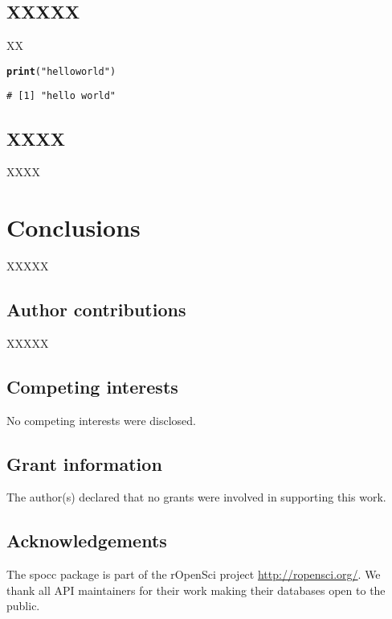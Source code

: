 \documentclass[10pt,a4paper,twocolumn]{article}\usepackage[]{graphicx}\usepackage[]{color}
\makeatletter
\newcommand{\hlstr}[1]{\textcolor[rgb]{0.192,0.494,0.8}{#1}}%
\newcommand{\hlstd}[1]{\textcolor[rgb]{0.345,0.345,0.345}{#1}}%
\newcommand{\hlkwd}[1]{\textcolor[rgb]{0.737,0.353,0.396}{\textbf{#1}}}%
\newenvironment{kframe}{%
 \def\at@end@of@kframe{}%
 \ifinner\ifhmode%
  \def\at@end@of@kframe{\end{minipage}}%
  \begin{minipage}{\columnwidth}%
 \fi\fi%
 \def\FrameCommand##1{\hskip\@totalleftmargin \hskip-\fboxsep
 \colorbox{shadecolor}{##1}\hskip-\fboxsep
     \hskip-\linewidth \hskip-\@totalleftmargin \hskip\columnwidth}%
 \MakeFramed {\advance\hsize-\width
   \@totalleftmargin\z@ \linewidth\hsize
   \@setminipage}}%
 {\par\unskip\endMakeFramed%
 \at@end@of@kframe}
\newenvironment{knitrout}{}{} %
\makeatother
\begin{document}
\subsection*{XXXXX}

XX

\begin{knitrout}\scriptsize
{}\color{fgcolor}\begin{kframe}
\begin{alltt}
\hlkwd{print}\hlstd{(}\hlstr{"hello world"}\hlstd{)}
\end{alltt}
\begin{verbatim}
# [1] "hello world"
\end{verbatim}
\end{kframe}
\end{knitrout}


\subsection*{XXXX}

XXXX

\section*{Conclusions}
XXXXX

\subsection*{Author contributions}
XXXXX

\subsection*{Competing interests}
No competing interests were disclosed.

\subsection*{Grant information}
The author(s) declared that no grants were involved in supporting this work.

\subsection*{Acknowledgements}
The spocc package is part of the rOpenSci project \url{http://ropensci.org/}. We thank all API maintainers for their work making their databases open to the public.

\nocite{*}
{\small
}
\end{document}
